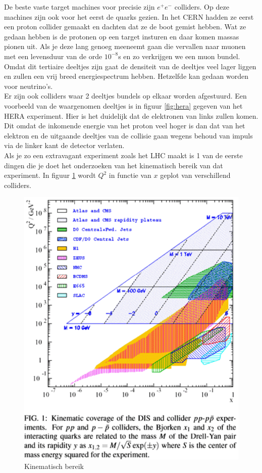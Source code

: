 \documentclass[../main.tex]{subfiles}
\begin{document}
De beste vaste target machines voor precisie zijn $e^+e^-$ colliders. Op deze machines zijn ook voor het eerst de quarks gezien. In het CERN hadden ze eerst een proton collider gemaakt en dachten dat ze de boot gemist hebben. Wat ze gedaan hebben is de protonen op een target insturen en daar komen massas pionen uit. Als je deze lang genoeg meeneemt gaan die vervallen naar muonen met een levensduur van de orde $10^{-8}$s en zo verkrijgen we een muon bundel. Omdat dit tertiaire deeltjes zijn gaat de densiteit van de deeltjes veel lager liggen en zullen een vrij breed energiespectrum hebben. Hetzelfde kan gedaan worden voor neutrino's.\\
Er zijn ook colliders waar 2 deeltjes bundels op elkaar worden afgestuurd. Een voorbeeld van de waargenomen deeltjes is in figuur \ref{fig:hera} gegeven van het HERA experiment. Hier is het duidelijk dat de elektronen van links zullen komen. Dit omdat de inkomende energie van het proton veel hoger is dan dat van het elektron en de uitgaande deeltjes van de collisie gaan wegens behoud van impuls via de linker kant de detector verlaten.\\
Als je zo een extravagant experiment zoals het LHC maakt is 1 van de eerste dingen die je doet het onderzoeken van het  kinematisch bereik van dat experiment. In figuur \ref{fig:kin_bereik} wordt $Q^2$ in functie van $x$ geplot van verschillend colliders.

\begin{figure}[h]
    \centering
    \includegraphics[width=0.8\linewidth]{DIS_nucleon_structuur_pdf/kin_bereik.png}
    \caption{Kinematisch bereik}%
    \label{fig:kin_bereik}
\end{figure}
\end{document}
